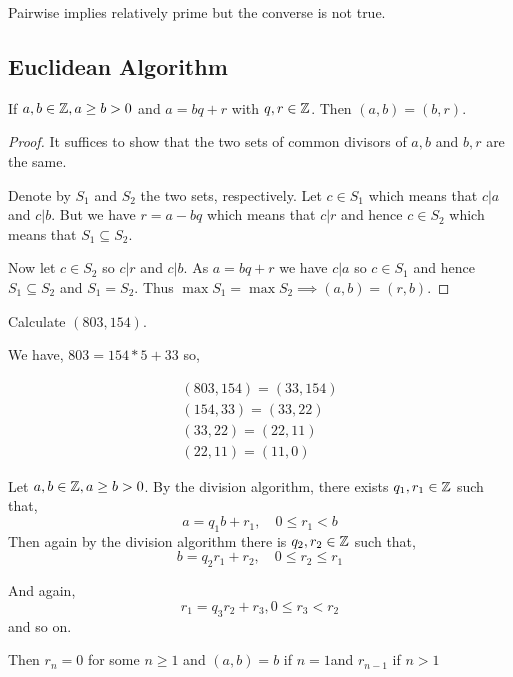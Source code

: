 \begin{note}
    Pairwise implies relatively prime but the converse is not true.
\end{note}


\subsection*{Euclidean Algorithm} 
\begin{lemma}
   If $a, b \in \mathbb{Z}, a \ge b > 0$ and $a = bq + r$ with  $q,r \in \mathbb{Z}$. Then  $(a, b) = (b, r)$.
\end{lemma}
\begin{proof}
    It suffices to show that the two sets of common divisors of $a,b$ and  $b,r$ are the same.

    Denote by $S_1$ and $S_2$ the two sets, respectively. Let $c \in S_1$ which means that $c | a$ and $c | b$. But we have  $r = a - bq$ which means that  $c | r$ and hence  $c \in S_2$ which means that $S_1 \subseteq S_2$.

    Now let $c \in S_2$ so $c | r$ and  $c | b$. As  $a = bq + r$ we have  $c | a$ so $c \in S_1$ and hence $S_1 \subseteq S_2$ and $S_1 = S_2$. Thus $\max S_1 =\max S_2 \implies (a, b) = (r, b)$.
\end{proof}

\begin{eg}
    Calculate $(803, 154)$. 

    We have,  $ 803 = 154 * 5 +  33 $ so, 

    \begin{align*}
        (803, 154) = (33, 154)\\
        (154, 33) = (33, 22)\\
        (33, 22) = (22, 11)\\
        (22, 11) = (11, 0)
    \end{align*}
\end{eg}
\begin{theorem}
   Let $a, b \in \mathbb{Z}, a \ge b > 0$. By the division algorithm, there exists $q_1, r_1 \in \mathbb{Z}$  such that, 
   $$ a  = q_1b + r_1, \quad  0\le r_1 < b $$ 
   Then again by the division algorithm there is $q_2, r_2 \in \mathbb{Z}$  such that, 
   $$ b = q_2r_1 + r_2, \quad 0 \le r_2 \le r_1$$ 

   And again, $$r_1 = q_3r_2 + r_3, 0 \le r_3 < r_2$$ and so on.

   Then $r_n = 0$ for some  $n \ge 1$ and $(a, b) = b$ if  $n = 1$and  $r_{n - 1}$ if  $n > 1$
\end{theorem}


